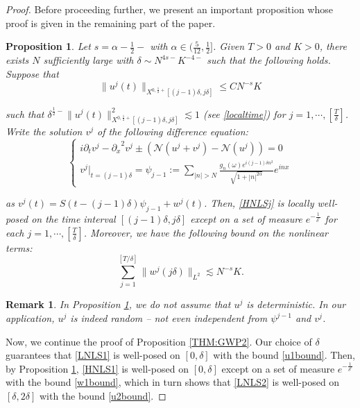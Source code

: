 \documentclass[11pt]{amsart}
\newtheorem{proposition}[theorem]{Proposition}
\newtheorem{remark}[theorem]{Remark}
\numberwithin{equation}{section} \numberwithin{theorem}{section}
\begin{document}
\begin{proof}
	\smallskip
	
	Before proceeding further, we present an important proposition whose proof is given in the remaining part of the paper. 
	\begin{proposition}
		\label{PROP:HNLS} Let $ s= {\alpha} - \frac{1}{2}-$ with ${\alpha} \in ( \frac{5}{12}, \frac{1}{2}]$. Given $T> 0$ and $K> 0$, there exists $N$ sufficiently large with ${\delta} \sim N^{4s-} K^{-4-}$ such that the following holds. Suppose that 
		\begin{equation}
			\label{ujbound} \|u^j(t)\|_{X^{0, \frac{1}{2}+}[(j-1){\delta}, j{\delta}]} \leq C N^{-s}K 
		\end{equation}
		
		{
\noindent} such that ${\delta}^{\frac{1}{2}-}\|u^j(t)\|_{X^{0, \frac{1}{2}+}[(j-1){\delta}, j{\delta}]}^2 \lesssim 1$ (see \eqref{localtime}) for $j = 1, \cdots, [\frac{T}{\delta}]$. Write the solution $v^j$ of the following difference equation: 
		\begin{equation}
			\label{HNLSj} 
			\begin{cases}
				i {
\partial_t} v^j - {
\partial_x}^2 v^j \pm (\mathcal{N} (u^j + v^j) - \mathcal{N}(u^j)) = 0 \\
				v^j|_{t= (j-1){\delta}} = \psi_{j-1} := \sum_{|n|> N} \frac{g_n(\omega)e^{i (j - 1) {\delta} n^2}}{\sqrt{1+|n|^{2{\alpha}}}} e^{inx} 
			\end{cases}
		\end{equation}
		
		{
\noindent} as $v^j (t) = S(t-(j-1){\delta})\psi_{j-1} + w^j(t)$. Then, \eqref{HNLSj} is locally well-posed on the time interval $[(j-1) {\delta}, j{\delta}]$ except on a set of measure $e^{-\frac{1}{{\delta}^c}}$ for each $j = 1, \cdots, [\frac{T}{\delta}]$. Moreover, we have the following bound on the nonlinear terms: 
		\begin{equation}
			\label{wjbound} \sum_{j = 1}^{[T/{\delta}]} \|w^j(j{\delta})\|_{L^2} \lesssim N^{-s}K. 
		\end{equation}
	\end{proposition}

\begin{remark} \rm
In Proposition \ref{PROP:HNLS}, we do not assume that $u^j$ is deterministic.
In our application, $u^j$ is indeed random -- not even independent from $\psi^{j-1}$ and $v^j$.
\end{remark}
	
	Now, we continue the proof of Proposition \ref{THM:GWP2}. Our choice of ${\delta}$ guarantees that \eqref{LNLS1} is well-posed on $[0, {\delta}]$ with the bound \eqref{u1bound}. Then, by Proposition \ref{PROP:HNLS}, \eqref{HNLS1} is well-posed on $[0, {\delta}]$ except on a set of measure $e^{-\frac{1}{{\delta}^c}}$ with the bound \eqref{w1bound}, which in turn shows that \eqref{LNLS2} is well-posed on $[{\delta}, 2{\delta}]$ with the bound \eqref{u2bound}. 
	

\end{proof}
\end{document}
